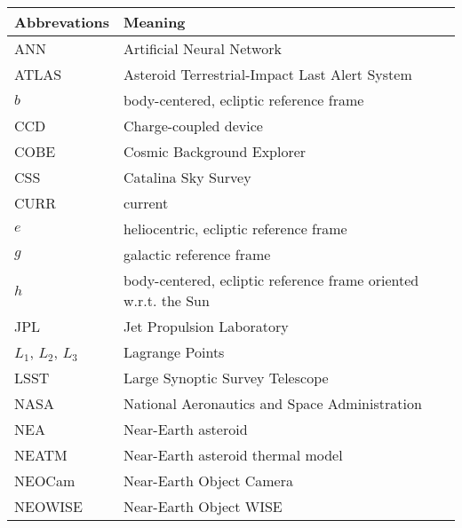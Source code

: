 \begin{table}[h!]
\centering
\begin{tabular}{l|l}
\textbf{Abbrevations} & \textbf{Meaning}                                                \\ \hline
ANN                   & Artificial Neural Network                                       \\
ATLAS                 & Asteroid Terrestrial-Impact Last Alert System                   \\
$b$                     & body-centered, ecliptic reference frame                         \\
CCD                   & Charge-coupled device                                           \\
COBE                  & Cosmic Background Explorer                                      \\
CSS                   & Catalina Sky Survey                                             \\
CURR                  & current                                                         \\
$e$                     & heliocentric, ecliptic reference frame                          \\
$g$                     & galactic reference frame                                        \\
$h$                     & body-centered, ecliptic reference frame oriented w.r.t. the Sun \\
JPL                   & Jet Propulsion Laboratory                                       \\
$L_1$, $L_2$, $L_3$            & Lagrange Points                                                 \\
LSST                  & Large Synoptic Survey Telescope                                 \\
NASA                  & National Aeronautics and Space Administration                   \\
NEA                   & Near-Earth asteroid                                             \\
NEATM                 & Near-Earth asteroid thermal model                               \\
NEOCam                & Near-Earth Object Camera                                        \\
NEOWISE               & Near-Earth Object WISE                                          \\

\end{tabular}
\end{table}

